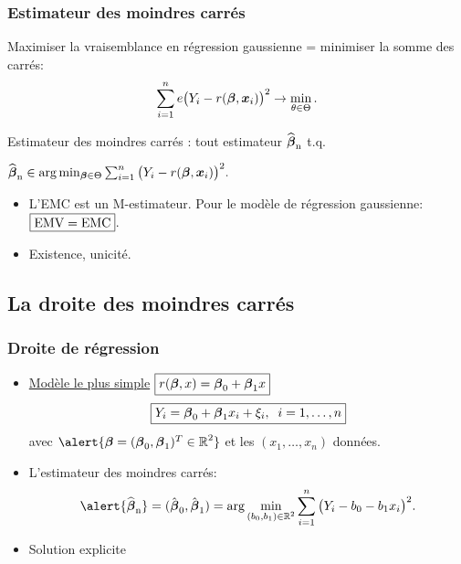 \begin{frame}
\frametitle{Estimateur des moindres carrés} Maximiser la
\alert{ vraisemblance} en régression gaussienne = minimiser
la somme des carrés: $$ \sum_{i = 1}^ne
\big(Y_i-r({\boldsymbol{\beta}},\operatorname{\boldsymbol{x}}_i)\big)^2 \to \min_{\theta \in\Theta}.
$$
\begin{df}
Estimateur des \alert{moindres carrés} : tout estimateur
$\operatorname{\widehat{\boldsymbol{\beta}}_n}$ t.q. \centerline{$\operatorname{\widehat{\boldsymbol{\beta}}_n} \in \arg \min_{\boldsymbol{\beta} \in
\Theta}\sum_{i = 1}^n \big(Y_i-r({\boldsymbol{\beta}},\operatorname{\boldsymbol{x}}_i)\big)^2.$}
\end{df}
\begin{itemize}
\item  L'EMC est un M-estimateur. Pour le
modèle de régression gaussienne: $\boxed{\rm EMV = EMC}$.
\item \alert{ Existence, unicité.}
\end{itemize}
\end{frame}

\subsection{La droite des moindres carrés}

\begin{frame}
\frametitle{Droite de régression}
\begin{itemize}
\item \underline{Modèle le plus simple}
$\boxed{r(\boldsymbol{\beta},x)= \boldsymbol{\beta}_0 + \boldsymbol{\beta}_1 x}$
$$\boxed{Y_i = \boldsymbol{\beta}_0 + \boldsymbol{\beta}_1 x_i+\xi_i,\;\;i=1,\ldots,n}$$
avec $\alert{\truebeta = (\truebeta_0,\truebeta_1)^T \in \R^2}$ et les
$(x_1,\ldots, x_n)$ données.
\item L'estimateur des moindres carrés:
$$\alert{\estregress}=(\hat{\truebeta}_0, \hat{\truebeta}_1) =
\arg \min_{(\curbeta_0,\curbeta_1)\in \R^2}\sum_{i = 1}^n \big(Y_i- \curbeta_0 - \curbeta_1 x_i\big)^2.
$$
\item \alert{Solution explicite}
\end{itemize}
\end{frame}

